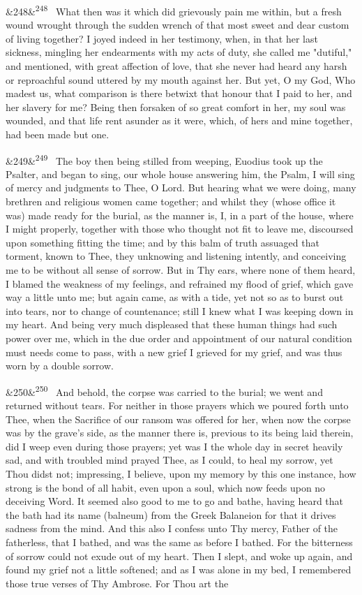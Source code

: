 \documentclass[12pt]{article}
\newcommand{\para}[1][]{\par\noindent\ifx&#1&\else\textsuperscript{\footnotesize #1}~\fi}
\begin{document}
\para[248] What then was it which did grievously pain me within, but a fresh wound wrought through the sudden wrench of that most sweet and dear custom of living together? I joyed indeed in her testimony, when, in that her last sickness, mingling her endearments with my acts of duty, she called me "dutiful," and mentioned, with great affection of love, that she never had heard any harsh or reproachful sound uttered by my mouth against her. But yet, O my God, Who madest us, what comparison is there betwixt that honour that I paid to her, and her slavery for me? Being then forsaken of so great comfort in her, my soul was wounded, and that life rent asunder as it were, which, of hers and mine together, had been made but one.

\para[249] The boy then being stilled from weeping, Euodius took up the Psalter, and began to sing, our whole house answering him, the Psalm, I will sing of mercy and judgments to Thee, O Lord. But hearing what we were doing, many brethren and religious women came together; and whilst they (whose office it was) made ready for the burial, as the manner is, I, in a part of the house, where I might properly, together with those who thought not fit to leave me, discoursed upon something fitting the time; and by this balm of truth assuaged that torment, known to Thee, they unknowing and listening intently, and conceiving me to be without all sense of sorrow. But in Thy ears, where none of them heard, I blamed the weakness of my feelings, and refrained my flood of grief, which gave way a little unto me; but again came, as with a tide, yet not so as to burst out into tears, nor to change of countenance; still I knew what I was keeping down in my heart. And being very much displeased that these human things had such power over me, which in the due order and appointment of our natural condition must needs come to pass, with a new grief I grieved for my grief, and was thus worn by a double sorrow.

\para[250] And behold, the corpse was carried to the burial; we went and returned without tears. For neither in those prayers which we poured forth unto Thee, when the Sacrifice of our ransom was offered for her, when now the corpse was by the grave's side, as the manner there is, previous to its being laid therein, did I weep even during those prayers; yet was I the whole day in secret heavily sad, and with troubled mind prayed Thee, as I could, to heal my sorrow, yet Thou didst not; impressing, I believe, upon my memory by this one instance, how strong is the bond of all habit, even upon a soul, which now feeds upon no deceiving Word. It seemed also good to me to go and bathe, having heard that the bath had its name (balneum) from the Greek Balaneion for that it drives sadness from the mind. And this also I confess unto Thy mercy, Father of the fatherless, that I bathed, and was the same as before I bathed. For the bitterness of sorrow could not exude out of my heart. Then I slept, and woke up again, and found my grief not a little softened; and as I was alone in my bed, I remembered those true verses of Thy Ambrose. For Thou art the
\end{document}

